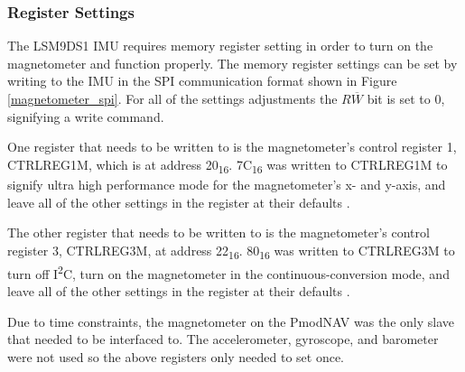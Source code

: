 \subsubsection{Register Settings} \label{imu_settings}
The LSM9DS1 IMU requires memory register setting in order to turn on the magnetometer and function properly. The memory register settings can be set by writing to the IMU in the SPI communication format shown in Figure \ref{magnetometer_spi}. For all of the settings adjustments the $R\overline{W}$ bit is set to 0, signifying a write command.
\par
One register that needs to be written to is the magnetometer's control register 1, CTRL\textunderscore{}REG\textunderscore{}1\textunderscore{}M, which is at address 20\textsubscript{16}. 7C\textsubscript{16} was written to CTRL\textunderscore{}REG\textunderscore{}1\textunderscore{}M to signify ultra high performance mode for the magnetometer's x- and y-axis, and leave all of the other settings in the register at their defaults \cite{lsm9ds1}.
\par
The other register that needs to be written to is the magnetometer's control register 3, CTRL\textunderscore{}REG\textunderscore{}3\textunderscore{}M, at address 22\textsubscript{16}. 80\textsubscript{16} was written to CTRL\textunderscore{}REG\textunderscore{}3\textunderscore{}M to turn off I\textsuperscript{2}C, turn on the magnetometer in the continuous-conversion mode, and leave all of the other settings in the register at their defaults \cite{lsm9ds1}.
\par
Due to time constraints, the magnetometer on the PmodNAV was the only slave that needed to be interfaced to. The accelerometer, gyroscope, and barometer were not used so the above registers only needed to set once.

